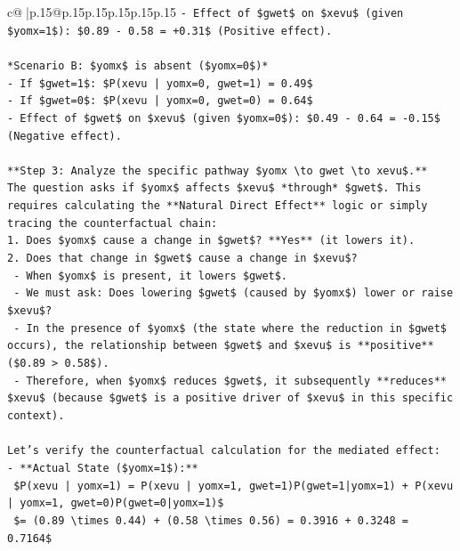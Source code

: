 \documentclass{article}
\begin{document}
{\begin{supertabular}{c@{$\;$}|p{.15\linewidth}@{}p{.15\linewidth}p{.15\linewidth}p{.15\linewidth}p{.15\linewidth}p{.15\linewidth}}
{{{\texttt{{-} Effect of \$gwet\$ on \$xevu\$ (given \$yomx=1\$): \$0.89 {-} 0.58 = +0.31\$ (Positive effect).} \\
\\ 
\texttt{*Scenario B: \$yomx\$ is absent (\$yomx=0\$)*} \\
\texttt{{-} If \$gwet=1\$: \$P(xevu | yomx=0, gwet=1) = 0.49\$} \\
\texttt{{-} If \$gwet=0\$: \$P(xevu | yomx=0, gwet=0) = 0.64\$} \\
\texttt{{-} Effect of \$gwet\$ on \$xevu\$ (given \$yomx=0\$): \$0.49 {-} 0.64 = {-}0.15\$ (Negative effect).} \\
\\ 
\texttt{**Step 3: Analyze the specific pathway \$yomx \textbackslash{}to gwet \textbackslash{}to xevu\$.**} \\
\texttt{The question asks if \$yomx\$ affects \$xevu\$ *through* \$gwet\$. This requires calculating the **Natural Direct Effect** logic or simply tracing the counterfactual chain:} \\
\texttt{1.  Does \$yomx\$ cause a change in \$gwet\$? **Yes** (it lowers it).} \\
\texttt{2.  Does that change in \$gwet\$ cause a change in \$xevu\$?} \\
\texttt{    {-} When \$yomx\$ is present, it lowers \$gwet\$.} \\
\texttt{    {-} We must ask: Does lowering \$gwet\$ (caused by \$yomx\$) lower or raise \$xevu\$?} \\
\texttt{    {-} In the presence of \$yomx\$ (the state where the reduction in \$gwet\$ occurs), the relationship between \$gwet\$ and \$xevu\$ is **positive** (\$0.89 > 0.58\$).} \\
\texttt{    {-} Therefore, when \$yomx\$ reduces \$gwet\$, it subsequently **reduces** \$xevu\$ (because \$gwet\$ is a positive driver of \$xevu\$ in this specific context).} \\
\\ 
\texttt{Let's verify the counterfactual calculation for the mediated effect:} \\
\texttt{{-} **Actual State (\$yomx=1\$):**} \\
\texttt{  \$P(xevu | yomx=1) = P(xevu | yomx=1, gwet=1)P(gwet=1|yomx=1) + P(xevu | yomx=1, gwet=0)P(gwet=0|yomx=1)\$} \\
\texttt{  \$= (0.89 \textbackslash{}times 0.44) + (0.58 \textbackslash{}times 0.56) = 0.3916 + 0.3248 = 0.7164\$} \\
\\ 
}}}
\end{supertabular}}
\end{document}
